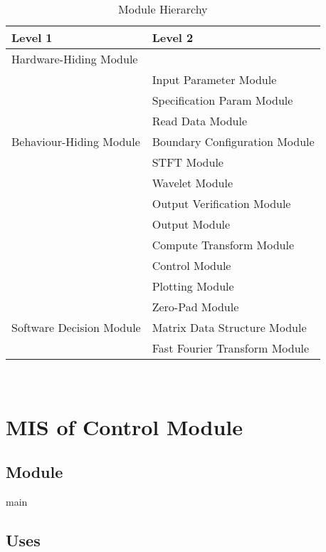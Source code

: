\documentclass[12pt, titlepage]{article}
\begin{document}
\begin{table}[h!]
\centering
\begin{tabular}{p{} p{}}
\toprule
\textbf{Level 1} & \textbf{Level 2}\\
\midrule

{Hardware-Hiding Module} & ~ \\
\midrule

\multirow{7}{0.3\textwidth}{Behaviour-Hiding Module} &  Input Parameter Module\\
& Specification Param Module \\
& Read Data Module\\
& Boundary Configuration Module \\
& STFT Module\\
& Wavelet Module\\
& Output Verification Module\\
& Output Module\\
& Compute Transform Module \\ 
& Control Module\\
& Plotting Module\\
\midrule

\multirow{3}{0.3\textwidth}{Software Decision Module} & { Zero-Pad Module}\\
& Matrix Data Structure Module\\ 
& Fast Fourier Transform Module\\
\bottomrule

\end{tabular}
\caption{Module Hierarchy}
\label{TblMH}
\end{table}

\newpage
~\newpage

\section{MIS of Control Module} \label{ControlModule} 



\subsection{Module}

main

\subsection{Uses}
\end{document}
